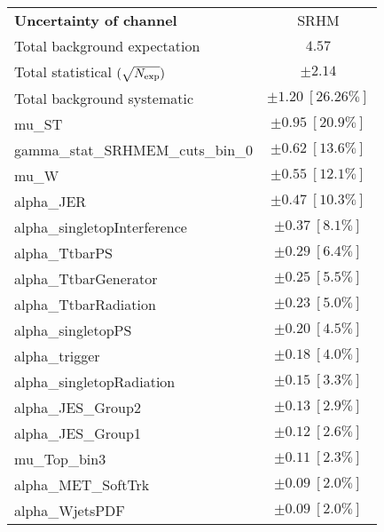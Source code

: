 
\begin{table}
\begin{center}
\setlength{\tabcolsep}{0.0pc}
\begin{tabular*}{\textwidth}{@{\extracolsep{\fill}}lc}
\noalign{\smallskip}\hline\noalign{\smallskip}
{\bf Uncertainty of channel}                                    & SRHM            \\
\noalign{\smallskip}\hline\noalign{\smallskip}
Total background expectation             &  $4.57$       \\
\noalign{\smallskip}\hline\noalign{\smallskip}
Total statistical $(\sqrt{N_{\rm exp}})$              & $\pm 2.14$       \\
Total background systematic               & $\pm 1.20\ [26.26\%] $             \\
\noalign{\smallskip}\hline\noalign{\smallskip}
\noalign{\smallskip}\hline\noalign{\smallskip}
mu\_ST         & $\pm 0.95\ [20.9\%] $       \\
gamma\_stat\_SRHMEM\_cuts\_bin\_0         & $\pm 0.62\ [13.6\%] $       \\
mu\_W         & $\pm 0.55\ [12.1\%] $       \\
alpha\_JER         & $\pm 0.47\ [10.3\%] $       \\
alpha\_singletopInterference         & $\pm 0.37\ [8.1\%] $       \\
alpha\_TtbarPS         & $\pm 0.29\ [6.4\%] $       \\
alpha\_TtbarGenerator         & $\pm 0.25\ [5.5\%] $       \\
alpha\_TtbarRadiation         & $\pm 0.23\ [5.0\%] $       \\
alpha\_singletopPS         & $\pm 0.20\ [4.5\%] $       \\
alpha\_trigger         & $\pm 0.18\ [4.0\%] $       \\
alpha\_singletopRadiation         & $\pm 0.15\ [3.3\%] $       \\
alpha\_JES\_Group2         & $\pm 0.13\ [2.9\%] $       \\
alpha\_JES\_Group1         & $\pm 0.12\ [2.6\%] $       \\
mu\_Top\_bin3         & $\pm 0.11\ [2.3\%] $       \\
alpha\_MET\_SoftTrk         & $\pm 0.09\ [2.0\%] $       \\
alpha\_WjetsPDF         & $\pm 0.09\ [2.0\%] $       \\

\end{tabular*}
\end{center}
\end{table}
